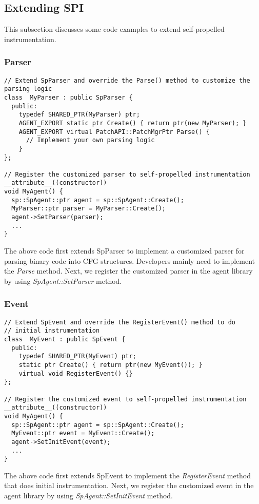 

\subsection{Extending SPI}
This subsection discusses some code examples to extend self-propelled
instrumentation.
\subsubsection{Parser}
\lstset{numbers=left}
\begin{lstlisting}[caption=Use customized parser]
// Extend SpParser and override the Parse() method to customize the parsing logic
class  MyParser : public SpParser {
  public:
    typedef SHARED_PTR(MyParser) ptr;
    AGENT_EXPORT static ptr Create() { return ptr(new MyParser); }
    AGENT_EXPORT virtual PatchAPI::PatchMgrPtr Parse() {
      // Implement your own parsing logic
    }
};

// Register the customized parser to self-propelled instrumentation
__attribute__((constructor))
void MyAgent() {
  sp::SpAgent::ptr agent = sp::SpAgent::Create();
  MyParser::ptr parser = MyParser::Create();
  agent->SetParser(parser);
  ...
}
\end{lstlisting}
The above code first extends SpParser to implement a customized parser for
parsing binary code into CFG structures. Developers mainly need to implement the
{\em Parse} method. Next, we register the customized parser in the agent library
by using {\em SpAgent::SetParser} method.

\subsubsection{Event}
\lstset{numbers=left}
\begin{lstlisting}[caption=Use customized event]
// Extend SpEvent and override the RegisterEvent() method to do 
// initial instrumentation
class  MyEvent : public SpEvent {
  public:
    typedef SHARED_PTR(MyEvent) ptr;
    static ptr Create() { return ptr(new MyEvent()); }
    virtual void RegisterEvent() {}
};

// Register the customized event to self-propelled instrumentation
__attribute__((constructor))
void MyAgent() {
  sp::SpAgent::ptr agent = sp::SpAgent::Create();
  MyEvent::ptr event = MyEvent::Create();
  agent->SetInitEvent(event);
  ...
}
\end{lstlisting}
The above code first extends SpEvent to implement the {\em RegisterEvent} method
that does initial instrumentation. Next, we register the customized event in
the agent library by using {\em SpAgent::SetInitEvent} method.

